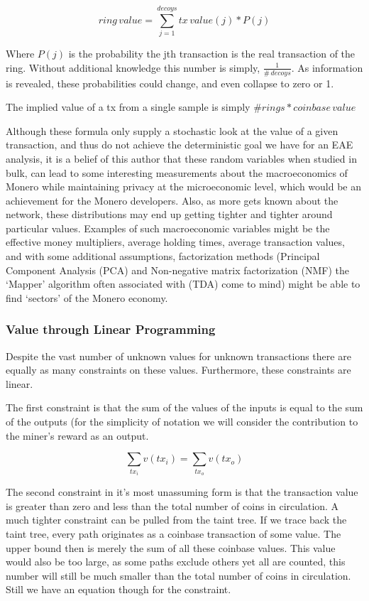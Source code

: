 \begin{equation}
ring\, value = \sum_{j=1}^{decoys}tx\, value(j)*P(j)
\end{equation}

Where $P(j)$ is the probability the jth transaction is the real transaction of the ring.  
Without additional knowledge this number is simply, $\frac{1}{\#\, decoys}$.
As information is revealed, these probabilities could change, and even collapse to zero or 1.

The implied value of a tx from a single sample is simply $\#rings * coinbase\, value $

Although these formula only supply a stochastic look at the value of a given transaction, and thus do not achieve the deterministic goal we have for an EAE analysis, it is a belief of this author that these random variables when studied in bulk, can lead to some interesting measurements about the macroeconomics of Monero while maintaining privacy at the microeconomic level, which would be an achievement for the Monero developers. 
Also, as more gets known about the network, these distributions may end up getting tighter and tighter around particular values. 
Examples of such macroeconomic variables might be the effective money multipliers, average holding times, average transaction values, and with some additional assumptions, factorization methods (Principal Component Analysis (PCA) and Non-negative matrix factorization (NMF) the `Mapper' algorithm often associated with (TDA) come to mind) might be able to find `sectors' of the Monero economy.  


\subsubsection{Value through Linear Programming}

Despite the vast number of unknown values for unknown transactions there are equally as many constraints on these values\cite{linear}.  
Furthermore, these constraints are linear.

The first constraint is that the sum of the values of the inputs is equal to the sum of the outputs (for the simplicity of notation we will consider the contribution to the miner's reward as an output.

\begin{equation}
\sum_{tx_i} v(tx_i) = \sum_{tx_o} v(tx_o)
\end{equation}

The second constraint in it's most unassuming form is that the transaction value is greater than zero and less than the total number of coins in circulation.
A much tighter constraint can be pulled from the taint tree. 
If we trace back the taint tree, every path originates as a coinbase transaction of some value.  
The upper bound then is merely the sum of all these coinbase values.  
This value would also be too large, as some paths exclude others yet all are counted, this number will still be much smaller than the total number of coins in circulation.
Still we have an equation though for the constraint.


